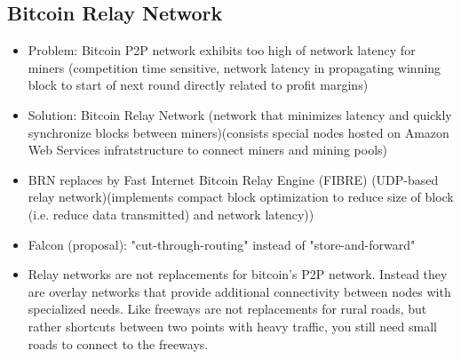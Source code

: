 \documentclass[english, 11pt]{article}
\begin{document}
\subsection{Bitcoin Relay Network}
\begin{itemize}
    \item Problem: Bitcoin P2P network exhibits too high of network latency for miners (competition time sensitive, network latency in propagating winning block to start of next round directly related to profit margins)
    \item Solution: Bitcoin Relay Network (network that minimizes latency and quickly synchronize blocks between miners)(consists special nodes hosted on Amazon Web Services infratstructure to connect miners and mining pools)
    \item BRN replaces by Fast Internet Bitcoin Relay Engine (FIBRE) (UDP-based relay network)(implements compact block optimization to reduce size of block (i.e. reduce data transmitted) and network latency))
    \item Falcon (proposal): "cut-through-routing" instead of "store-and-forward"
    \item Relay networks are not replacements for bitcoin’s P2P network. Instead they are overlay networks that provide additional connectivity between nodes with specialized needs. Like freeways are not replacements for rural roads, but rather shortcuts between two points with heavy traffic, you still need small roads to connect to the freeways.
\end{itemize}
\end{document}
